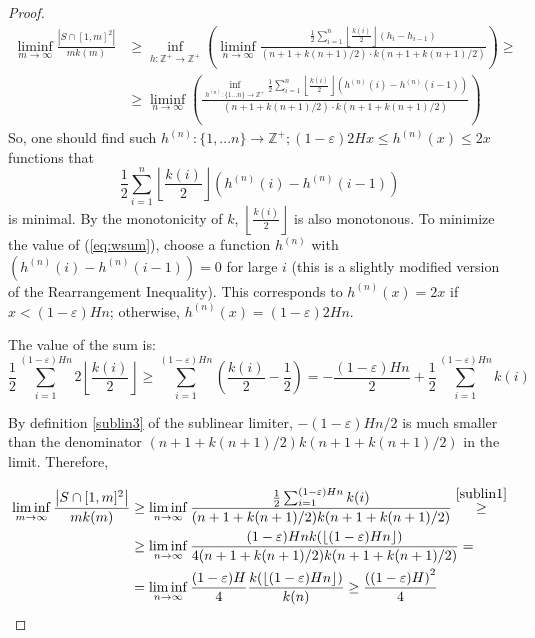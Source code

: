\documentclass[11pt,a4paper]{article}
\numberwithin{equation}{section}
\newcommand{\Z}{\mathbb{Z}}
\begin{document}
\begin{proof}
\begin{align*}
 \displaystyle\liminf_{m\to\infty} \frac{\left|S \cap [1,m]^2\right|}{m k(m)} &\geq \inf_{h: \Z^+ \to \Z^+ } \left( \displaystyle\liminf_{n\to\infty} \frac{\displaystyle\frac{1}{2}\sum_{i=1}^{n} \left\lfloor \frac{k(i)}{2} \right\rfloor (h_i - h_{i-1}) }{{(n+1+k(n+1)/2)\cdot k(n+1+k(n+1)/2)}}\right) \geq
\\&\geq  \displaystyle\liminf_{n\to\infty} \left( \frac{\displaystyle\inf_{h^{(n)}: \{ 1 \dots n \} \to \Z^+ } \displaystyle\frac{1}{2}\sum_{i=1}^{n} \left\lfloor \frac{k(i)}{2} \right\rfloor (h^{(n)} (i) - h^{(n)} (i-1))}{{(n+1+k(n+1)/2)\cdot k(n+1+k(n+1)/2)}} \right)
\end{align*}
So, one should find such $h^{(n)}: \{1,...n\} \to \Z^+; (1 - \varepsilon) 2 H x \leq h^{(n)} (x) \leq 2x$ functions that 
\begin{equation} \label{eq:wsum}
    \frac{1}{2}\sum_{i=1}^{n} \left\lfloor \frac{k(i)}{2} \right\rfloor \left(h^{(n)}(i) - h^{(n)}(i-1) \right)
\end{equation}
is minimal. By the monotonicity of $k$, $\left\lfloor \frac{k(i)}{2} \right\rfloor$ is also monotonous. To minimize the value of (\ref{eq:wsum}), choose a function $h^{(n)}$ with $\left(h^{(n)}(i) - h^{(n)}(i-1) \right) = 0$ for large $i$ (this is a slightly modified version of the Rearrangement Inequality).  This corresponds to $h^{(n)}(x) = 2x$ if $x < (1 - \varepsilon) Hn$; otherwise, $h^{(n)}(x) = (1 - \varepsilon) 2Hn$.

\noindent The value of the sum is:
$$
\frac{1}{2}\sum_{i=1}^{(1 - \varepsilon)Hn} 2 \left\lfloor \frac{k(i)}{2} \right\rfloor \geq \sum_{i=1}^{(1 - \varepsilon)Hn} \left(\frac{k(i)}{2} - \frac{1}{2}\right)= -\frac{(1 - \varepsilon)Hn}{2} + \frac{1}{2}\sum_{i=1}^{(1 - \varepsilon)Hn} k(i)
$$

\noindent By definition \ref{sublin3} of the sublinear limiter, $-(1 - \varepsilon)Hn/2$ is much smaller than the denominator $(n+1+k(n+1)/2)k(n+1+k(n+1)/2)$ in the limit. Therefore,

\begin{align*}
\displaystyle\liminf_{m\to\infty} \frac{\left|S \cap [1,m]^2\right|}{m k(m)} &\ge
\displaystyle\liminf_{n\to\infty}  \frac{\frac{1}{2}\sum_{i=1}^{(1 - \varepsilon)Hn} k(i)}{(n+1+k(n+1)/2)k(n+1+k(n+1)/2)} \overset{\ref{sublin1}}{\ge}
\\&\geq \displaystyle\liminf_{n\to\infty} \frac{(1 - \varepsilon)Hn k(\lfloor(1 - \varepsilon)Hn\rfloor)}{4(n+1+k(n+1)/2)k(n+1+k(n+1)/2)} =
\\&= \displaystyle\liminf_{n\to\infty} \frac{(1 - \varepsilon)H}{4} \frac{k(\lfloor(1 - \varepsilon)Hn\rfloor)}{k(n)}\ge  \frac{\left((1 - \varepsilon)H\right)^2}{4}
\end{align*}




\end{proof}
\end{document}
